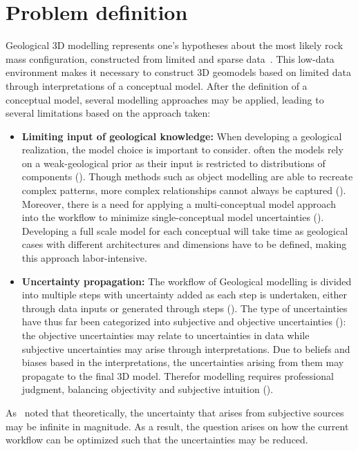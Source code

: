 \section{Problem definition}
Geological 3D modelling represents one's hypotheses about the most likely rock mass configuration, constructed from limited and sparse data~\cite{koltermann1996heterogeneity}. 
This low-data environment makes it necessary to construct 3D geomodels based on limited data through interpretations of a conceptual model. 
After the definition of a conceptual model, several modelling approaches may be applied, leading to several limitations based on the approach taken:
\begin{itemize}
    \item \textbf{Limiting input of geological knowledge:} When developing a geological realization, the model choice is important to consider. often the models rely on a weak-geological prior as their input is restricted to distributions of components (\cite{rongier2025atowards}). Though methods such as object modelling are able to recreate complex patterns, more complex relationships cannot always be captured (\cite{sun2023geological}). Moreover, there is a need for applying a multi-conceptual model approach into the workflow to minimize single-conceptual model uncertainties (\cite{ENEMARK2019310}). Developing a full scale model for each conceptual will take time as geological cases with different architectures and dimensions have to be defined, making this approach labor-intensive.
    \item \textbf{Uncertainty propagation:} The workflow of Geological modelling is divided into multiple steps with uncertainty added as each step is undertaken, either through data inputs or generated through steps (\cite{hoyer2024evaluating}). The type of uncertainties have thus far been categorized into subjective and objective uncertainties (\cite{fookes1997geology}): the objective uncertainties may relate to uncertainties in data while subjective uncertainties may arise through interpretations. Due to beliefs and biases based in the interpretations, the uncertainties arising from them may propagate to the final 3D model. Therefor modelling requires professional judgment, balancing objectivity and subjective intuition (\cite{zorzi20253d}).
\end{itemize}
As~\cite{caers2011modeling} noted that theoretically, the uncertainty that arises from subjective sources may be infinite in magnitude. As a result, the question arises on how the current workflow can be optimized such that the uncertainties may be reduced. 

